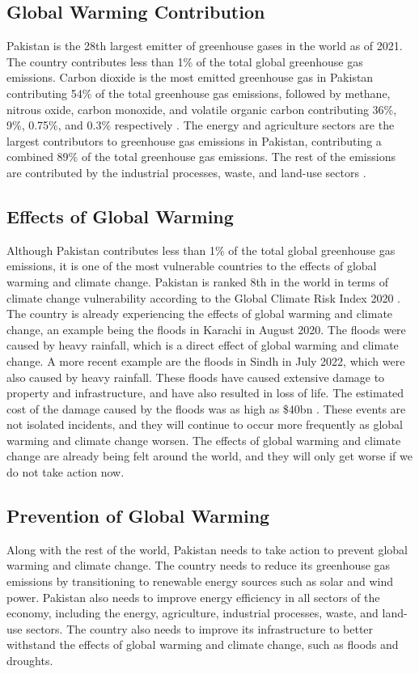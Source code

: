 \documentclass{article}
\begin{document}
\subsection{Global Warming Contribution}
Pakistan is the 28th largest emitter of greenhouse gases in the world as of
2021\cite{Ritchie_Roser_Rosado}. The country contributes less than 1\% of the
total global greenhouse gas emissions. Carbon dioxide is the most emitted
greenhouse gas in Pakistan contributing 54\% of the total greenhouse gas
emissions, followed by methane, nitrous oxide, carbon monoxide, and volatile
organic carbon contributing 36\%, 9\%, 0.75\%, and 0.3\% respectively
\cite{hussain2019comprehensive}. The energy and agriculture sectors are the
largest contributors to greenhouse gas emissions in Pakistan, contributing a
combined 89\% of the total greenhouse gas emissions. The rest of the emissions
are contributed by the industrial processes, waste, and land-use sectors
\cite{mir2017sectoral}.

\subsection{Effects of Global Warming}
Although Pakistan contributes less than 1\% of the total global greenhouse gas
emissions, it is one of the most vulnerable countries to the effects of global
warming and climate change. Pakistan is ranked 8th in the world in terms of
climate change vulnerability according to the Global Climate Risk Index 2020
\cite{Eckstein_Künzel_Schäfer_Winges}. The country is already experiencing the
effects of global warming and climate change, an example being the floods in
Karachi in August 2020. The floods were caused by heavy rainfall, which is a
direct effect of global warming and climate change. A more recent example are
the floods in Sindh in July 2022, which were also caused by heavy rainfall.
These floods have caused extensive damage to property and infrastructure, and
have also resulted in loss of life. The estimated cost of the damage caused by
the floods was as high as \$40bn \cite{Javaid_2022}. These events are not
isolated incidents, and they will continue to occur more frequently as global
warming and climate change worsen. The effects of global warming and climate
change are already being felt around the world, and they will only get worse if
we do not take action now.

\subsection{Prevention of Global Warming}
Along with the rest of the world, Pakistan needs to take action to prevent
global warming and climate change. The country needs to reduce its greenhouse
gas emissions by transitioning to renewable energy sources such as solar and
wind power. Pakistan also needs to improve energy efficiency in all sectors of
the economy, including the energy, agriculture, industrial processes, waste,
and land-use sectors. The country also needs to improve its infrastructure to
better withstand the effects of global warming and climate change, such as
floods and droughts.
\end{document}
